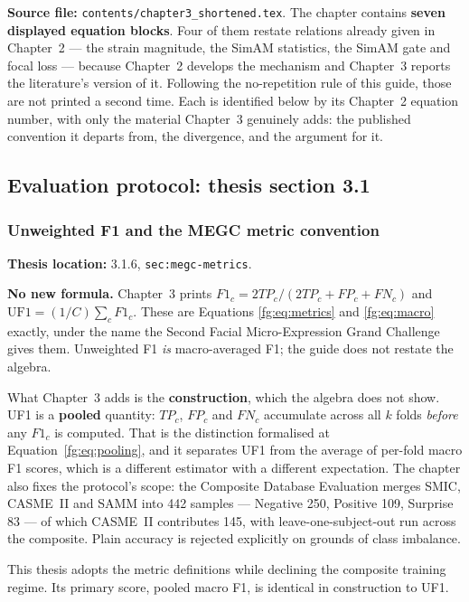 \documentclass[11pt,a4paper]{article}
\numberwithin{equation}{section}
\begin{document}
\textbf{Source file:} \texttt{contents/chapter3\_shortened.tex}. The chapter
contains \textbf{seven displayed equation blocks}. Four of them restate
relations already given in Chapter~2 --- the strain magnitude, the SimAM
statistics, the SimAM gate and focal loss --- because Chapter~2 develops the
mechanism and Chapter~3 reports the literature's version of it. Following the
no-repetition rule of this guide, those are not printed a second time. Each is
identified below by its Chapter~2 equation number, with only the material
Chapter~3 genuinely adds: the published convention it departs from, the
divergence, and the argument for it.

\subsection{Evaluation protocol: thesis section 3.1}

\subsubsection{Unweighted F1 and the MEGC metric convention}
\label{fg:uf1}
\textbf{Thesis location:} 3.1.6, \texttt{sec:megc-metrics}.

\textbf{No new formula.} Chapter~3 prints
$F1_c = 2TP_c/(2TP_c + FP_c + FN_c)$ and
$\text{UF1} = (1/C)\sum_c F1_c$. These are Equations
\eqref{fg:eq:metrics} and \eqref{fg:eq:macro} exactly, under the name the
Second Facial Micro-Expression Grand Challenge gives them. Unweighted F1
\emph{is} macro-averaged F1; the guide does not restate the algebra.

What Chapter~3 adds is the \textbf{construction}, which the algebra does not
show. UF1 is a \textbf{pooled} quantity: $TP_c$, $FP_c$ and $FN_c$ accumulate
across all $k$ folds \emph{before} any $F1_c$ is computed. That is the
distinction formalised at Equation~\eqref{fg:eq:pooling}, and it separates UF1
from the average of per-fold macro F1 scores, which is a different estimator
with a different expectation. The chapter also fixes the protocol's scope: the
Composite Database Evaluation merges SMIC, CASME~II and SAMM into 442
samples --- Negative 250, Positive 109, Surprise 83 --- of which CASME~II
contributes 145, with leave-one-subject-out run across the composite. Plain
accuracy is rejected explicitly on grounds of class imbalance.

This thesis adopts the metric definitions while declining the composite
training regime. Its primary score, pooled macro F1, is identical in
construction to UF1.
\end{document}
